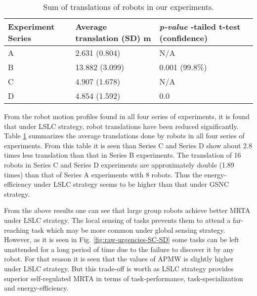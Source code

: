 \begin{table}
\begin{center}
\caption{Sum of translations of robots in our experiments.}
\begin{tabular}{|p{0.8in}|m{1in}|m{0.9in}|}
\hline Experiment \protect\newline Series & Average \protect\newline translation \protect\newline(SD) m & \textit{p-value} \protect\newline 1-tailed t-test (confidence)\\ 
\hline A & 2.631 (0.804) & N/A\\ 
\hline B & 13.882 (3.099) & 0.001 (99.8\%)\\
\hline C & 4.907 (1.678) & N/A\\
\hline D  & 4.854  (1.592) & 0.0\\
\hline
\end{tabular}
\label{table:motion-cmp} 
\end{center}
\end{table}
From the robot motion profiles found in all four series of experiments,  it is found that under LSLC strategy, robot translations have been reduced significantly. Table \ref{table:motion-cmp} summarizes the average translations done by robots in all four series of experiments. From this table it is seen than Series C and Series D show about 2.8 times less translation than that in Series B experiments. The translation of 16 robots in Series C and Series D experiments are approximately double (1.89 times) than that of Series A experiments with 8 robots.  Thus the energy-efficiency under LSLC strategy seems to be higher  than that under GSNC strategy.

From the above results one can see that large group robots achieve better MRTA under LSLC strategy. The local sensing of tasks prevents them to attend a far-reaching task which may be more common under global sensing strategy. However, as it is seen in Fig. \ref{fig:raw-urgencies-SC-SD}
some tasks can be left unattended for a long period of time due to the failure to discover it by any robot. For that reason it is seen that the values of APMW is slightly higher under LSLC strategy. But this trade-off is worth as LSLC strategy provides superior self-regulated MRTA in terms of task-performance, task-specialization and energy-efficiency.
